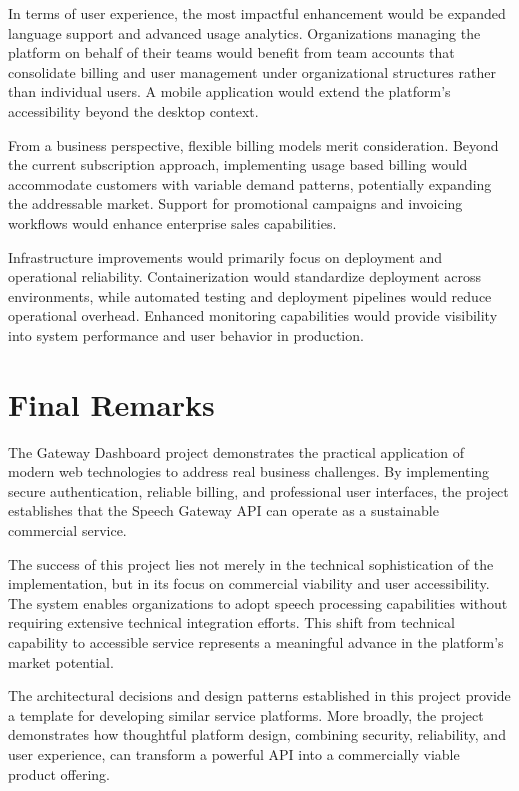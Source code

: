 In terms of user experience, the most impactful enhancement would be expanded language support and advanced usage analytics. Organizations managing the platform on behalf of their teams would benefit from team accounts that consolidate billing and user management under organizational structures rather than individual users. A mobile application would extend the platform's accessibility beyond the desktop context.

From a business perspective, flexible billing models merit consideration. Beyond the current subscription approach, implementing usage based billing would accommodate customers with variable demand patterns, potentially expanding the addressable market. Support for promotional campaigns and invoicing workflows would enhance enterprise sales capabilities.

Infrastructure improvements would primarily focus on deployment and operational reliability. Containerization would standardize deployment across environments, while automated testing and deployment pipelines would reduce operational overhead. Enhanced monitoring capabilities would provide visibility into system performance and user behavior in production.

\section{Final Remarks}

The Gateway Dashboard project demonstrates the practical application of modern web technologies to address real business challenges. By implementing secure authentication, reliable billing, and professional user interfaces, the project establishes that the Speech Gateway API can operate as a sustainable commercial service.

The success of this project lies not merely in the technical sophistication of the implementation, but in its focus on commercial viability and user accessibility. The system enables organizations to adopt speech processing capabilities without requiring extensive technical integration efforts. This shift from technical capability to accessible service represents a meaningful advance in the platform's market potential.

The architectural decisions and design patterns established in this project provide a template for developing similar service platforms. More broadly, the project demonstrates how thoughtful platform design, combining security, reliability, and user experience, can transform a powerful API into a commercially viable product offering.
